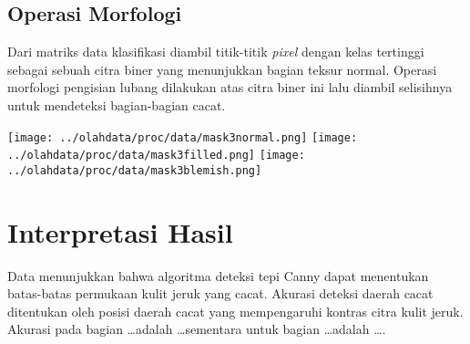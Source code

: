 \documentclass[laporan.tex]{subfiles}
\begin{document}
\subsection{Operasi Morfologi}

Dari matriks data klasifikasi diambil titik-titik \emph{pixel} dengan kelas tertinggi sebagai sebuah citra biner yang menunjukkan bagian teksur normal. Operasi morfologi pengisian lubang dilakukan atas citra biner ini lalu diambil selisihnya untuk mendeteksi bagian-bagian cacat.

\texttt{[image: ../olahdata/proc/data/mask3normal.png]}
\texttt{[image: ../olahdata/proc/data/mask3filled.png]}
\texttt{[image: ../olahdata/proc/data/mask3blemish.png]}

\section{Interpretasi Hasil}

Data menunjukkan bahwa algoritma deteksi tepi Canny dapat menentukan batas-batas permukaan kulit jeruk yang cacat. Akurasi deteksi daerah cacat ditentukan oleh posisi daerah cacat yang mempengaruhi kontras citra kulit jeruk. Akurasi pada bagian \ldots adalah \ldots sementara untuk bagian \ldots adalah \ldots.


\end{document}
